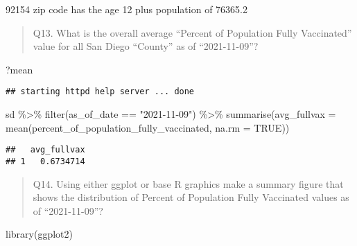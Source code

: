 \documentclass[
]{article}
\newenvironment{Shaded}{\begin{snugshade}}{\end{snugshade}}
\newcommand{\AttributeTok}[1]{\textcolor[rgb]{0.77,0.63,0.00}{#1}}
\newcommand{\ConstantTok}[1]{\textcolor[rgb]{0.00,0.00,0.00}{#1}}
\newcommand{\FunctionTok}[1]{\textcolor[rgb]{0.00,0.00,0.00}{#1}}
\newcommand{\NormalTok}[1]{#1}
\newcommand{\OtherTok}[1]{\textcolor[rgb]{0.56,0.35,0.01}{#1}}
\newcommand{\SpecialCharTok}[1]{\textcolor[rgb]{0.00,0.00,0.00}{#1}}
\newcommand{\StringTok}[1]{\textcolor[rgb]{0.31,0.60,0.02}{#1}}
\begin{document}
92154 zip code has the age 12 plus population of 76365.2

\begin{quote}
Q13. What is the overall average ``Percent of Population Fully
Vaccinated'' value for all San Diego ``County'' as of ``2021-11-09''?
\end{quote}

\begin{Shaded}
\begin{Highlighting}[]
\NormalTok{?mean}
\end{Highlighting}
\end{Shaded}

\begin{verbatim}
## starting httpd help server ... done
\end{verbatim}

\begin{Shaded}
\begin{Highlighting}[]
\NormalTok{sd }\SpecialCharTok{\%\textgreater{}\%} 
  \FunctionTok{filter}\NormalTok{(as\_of\_date }\SpecialCharTok{==} \StringTok{"2021{-}11{-}09"}\NormalTok{) }\SpecialCharTok{\%\textgreater{}\%} 
  \FunctionTok{summarise}\NormalTok{(}\AttributeTok{avg\_fullvax =} \FunctionTok{mean}\NormalTok{(percent\_of\_population\_fully\_vaccinated, }\AttributeTok{na.rm =} \ConstantTok{TRUE}\NormalTok{))}
\end{Highlighting}
\end{Shaded}

\begin{verbatim}
##   avg_fullvax
## 1   0.6734714
\end{verbatim}

\begin{quote}
Q14. Using either ggplot or base R graphics make a summary figure that
shows the distribution of Percent of Population Fully Vaccinated values
as of ``2021-11-09''?
\end{quote}

\begin{Shaded}
\begin{Highlighting}[]
\FunctionTok{library}\NormalTok{(ggplot2)}
\end{Highlighting}
\end{Shaded}

\begin{Shaded}
\end{Shaded}
\end{document}
